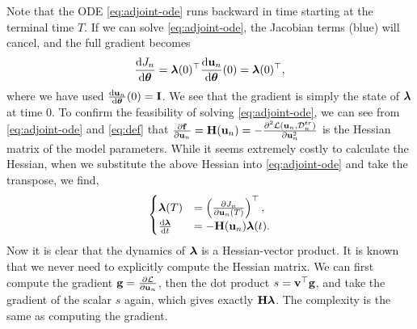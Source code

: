 Note that the ODE \eqref{eq:adjoint-ode} runs backward in time starting at the terminal time $T$. If we can solve \eqref{eq:adjoint-ode}, the Jacobian terms (blue) will cancel, and the full gradient becomes 
\begin{align}
	\frac{{\rm d} J_n}{{\rm d} \boldsymbol{\theta}} = \boldsymbol{\lambda}(0)^\top \frac{{\rm d} {\bf u}_n}{{\rm d} \boldsymbol{\theta}}(0) =  \boldsymbol{\lambda}(0)^\top, 
\end{align}
where we have used $\frac{{\rm d} {\bf u}_n}{{\rm d} \boldsymbol{\theta}}(0) = {\bf I}$. We see that the gradient is simply the state of $\boldsymbol{\lambda}$ at time $0$. To confirm the feasibility of solving \eqref{eq:adjoint-ode}, we can see from  \eqref{eq:adjoint-ode} and \eqref{eq:def} that $\frac{\partial {\bf f}}{\partial {\bf u}_n} = {\bf H}({{\bf u}_n}) = -\frac{\partial^2 \mathcal{L}({\bf u}_n, \mathcal{D}_n^{tr})}{\partial {\bf u}_n^2}$
 is the Hessian matrix of the model parameters. While it seems extremely costly to calculate the Hessian, when we substitute the above Hessian into \eqref{eq:adjoint-ode} and  take the transpose, we find,
 \begin{align}
 	\begin{cases}
 	\boldsymbol{\lambda}(T) &= \left(\frac{\partial J_n}{\partial {\bf u}_n(T)}\right)^\top, \\
 	 \frac{{\rm d} \boldsymbol{\lambda}}{{\rm d} t} &= - {\bf H}({\bf u}_n) \boldsymbol{\lambda}(t). \label{eq:adjoint-ode-v2}
 	\end{cases}
 \end{align}
Now it is clear that the dynamics of $\boldsymbol{\lambda}$ is a Hessian-vector product. It is known that we never need to explicitly compute the Hessian matrix. We can first compute the gradient ${\bf g} =\frac{\partial \mathcal{L}}{\partial {\bf u}_n}$,  then the dot product $s = {\bf v}^\top {\bf g}$, and take the gradient of the scalar $s$ again, which gives exactly ${\bf H}\boldsymbol{\lambda}$.  The complexity is the same as computing the gradient.

